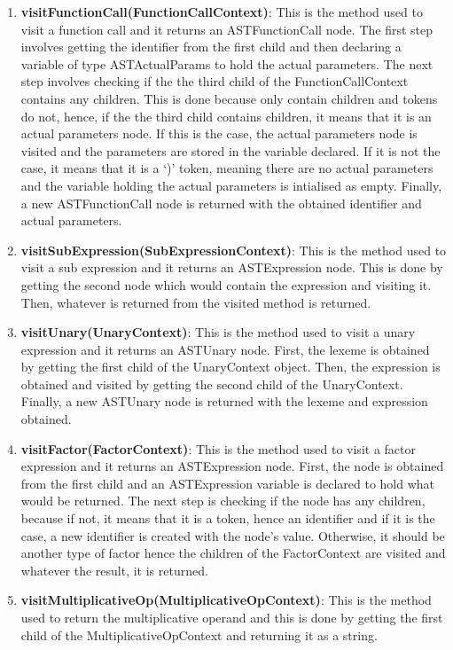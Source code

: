 \documentclass{article}
\begin{document}
\begin{enumerate}
					\item \textbf{visitFunctionCall(FunctionCallContext)}: This is the method used to visit a function call and it returns an ASTFunctionCall node. The first step involves getting the identifier from the first child and then declaring a variable of type ASTActualParams to hold the actual parameters. The next step involves checking if the the third child of the FunctionCallContext contains any children. This is done because only contain children and tokens do not, hence, if the the third child contains children, it means that it is an actual parameters node. If this is the case, the actual parameters node is visited and the parameters are stored in the variable declared. If it is not the case, it means that it is a `)' token, meaning there are no actual parameters and the variable holding the actual parameters is intialised as empty. Finally, a new ASTFunctionCall node is returned with the obtained identifier and actual parameters.
					
					\item \textbf{visitSubExpression(SubExpressionContext)}: This is the method used to visit a sub expression and it returns an ASTExpression node. This is done by getting the second node which would contain the expression and visiting it. Then, whatever is returned from the visited method is returned.
					
					\item \textbf{visitUnary(UnaryContext)}: This is the method used to visit a unary expression and it returns an ASTUnary node. First, the lexeme is obtained by getting the first child of the UnaryContext object. Then, the expression is obtained and visited by getting the second child of the UnaryContext. Finally, a new ASTUnary node is returned with the lexeme and expression obtained.
					
					\item \textbf{visitFactor(FactorContext)}: This is the method used to visit a factor expression and it returns an ASTExpression node. First, the node is obtained from the first child and an ASTExpression variable is declared to hold what would be returned. The next step is checking if the node has any children, because if not, it means that it is a token, hence an identifier and if it is the case, a new identifier is created with the node's value. Otherwise, it should be another type of factor hence the children of the FactorContext are visited and whatever the result, it is returned.
					
					\item \textbf{visitMultiplicativeOp(MultiplicativeOpContext)}: This is the method used to return the multiplicative operand and this is done by getting the first child of the MultiplicativeOpContext and returning it as a string.
					

\end{enumerate}
\end{document}
